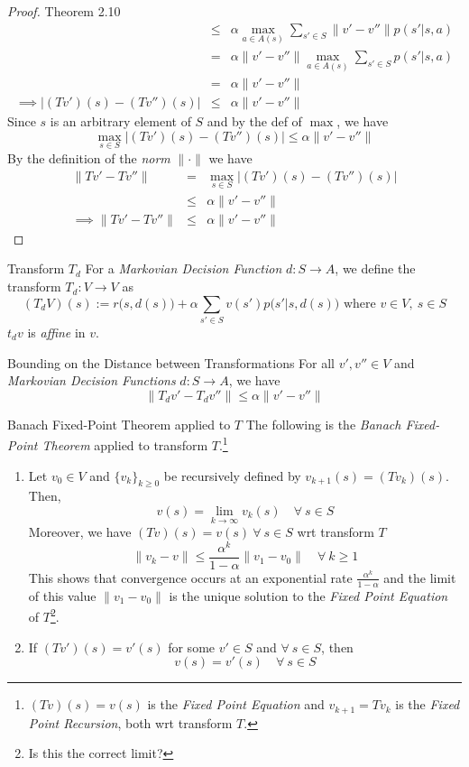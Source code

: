 \documentclass[11pt,a4paper]{article}
\begin{document}
\begin{proof}{Theorem 2.10}
\[\begin{array}{rcl}
      &\leq&\alpha\max_{a\in A(s)}\sum_{s'\in S}\|v'-v''\|p(s'|s,a)\\
      &=&\alpha\|v'-v''\|\max_{a\in A(s)}\sum_{s'\in S}p(s'|s,a)\\
      &=&\alpha\|v'-v''\|\\
      \implies|(Tv')(s)-(Tv'')(s)|&\leq&\alpha\|v'-v''\|
    \end{array}\]
    Since $s$ is an arbitrary element of $S$ and by the def of $\max$, we have
    \[ \max_{s\in S}\left|(Tv')(s)-(Tv'')(s)\right|\leq\alpha\|v'-v''\| \]
    By the definition of the \textit{norm} $\|\cdot\|$ we have\\
    \[\begin{array}{rcl}
      \|Tv'-Tv''\|&=&\max_{s\in S}\left|(Tv')(s)-(Tv'')(s)\right|\\
      &\leq&\alpha\|v'-v''\|\\
      \implies\|Tv'-Tv''\|&\leq&\alpha\|v'-v''\|
    \end{array}\]
    \proved
  \end{proof}

  \begin{definition}{Transform $T_d$}
    For a \textit{Markovian Decision Function} $d:S\to A$, we define the transform $T_d:V\to V$ as
    \[ (T_dV)(s):=r\big(s,d(s)\big)+\alpha\sum_{s'\in S}v(s')p\big(s'|s,d(s)\big)\text{ where }v\in V,\ s\in S \]
    $t_dv$ is \textit{affine} in $v$.
  \end{definition}

  \begin{theorem}{Bounding on the Distance between Transformations}
    For all $v',v''\in V$ and \textit{Markovian Decision Functions} $d:S\to A$, we have
    \[ \|T_dv'-T_dv''\|\leq\alpha\|v'-v''\| \]
  \end{theorem}

  \begin{theorem}{Banach Fixed-Point Theorem applied to $T$}
    The following is the \textit{Banach Fixed-Point Theorem} applied to transform $T$.\footnote{$(Tv)(s)=v(s)$ is the \textit{Fixed Point Equation} and $v_{k+1}=Tv_k$ is the \textit{Fixed Point Recursion}, both wrt transform $T$.}
    \begin{enumerate}
      \item Let $v_0\in V$ and $\{v_k\}_{k\geq0}$ be recursively defined by $v_{k+1}(s)=(Tv_k)(s)$. Then,
      \[ v(s)=\lim_{k\to\infty}v_k(s)\quad\forall\ s\in S \]
      Moreover, we have $(Tv)(s)=v(s)\ \forall\ s\in S$ wrt transform $T$
      \[ \|v_k-v\|\leq\frac{\alpha^k}{1-\alpha}\|v_1-v_0\|\quad\forall\ k\geq1 \]
      This shows that convergence occurs at an exponential rate $\frac{\alpha^k}{1-\alpha}$ and the limit of this value $\|v_1-v_0\|$ is the unique solution to the \textit{Fixed Point Equation} of $T$\footnote{Is this the correct limit?}.
      \item If $(Tv')(s)=v'(s)$ for some $v'\in S$ and $\forall\ s\in S$, then
      \[ v(s)=v'(s)\quad\forall\ s\in S \]
    \end{enumerate}
  \end{theorem}
\end{document}
